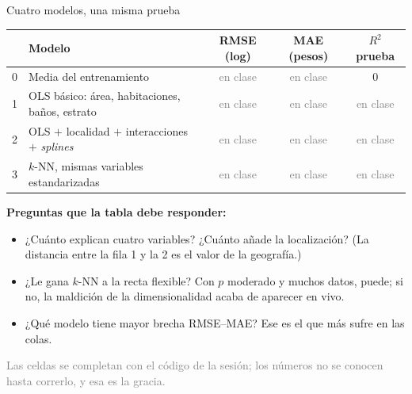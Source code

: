\documentclass{beamer}
\newcommand{\1}{\mathbb{I}}
\begin{document}
\begin{frame}{Cuatro modelos, una misma prueba}
\small
\begin{center}
\scriptsize
\setlength{\tabcolsep}{4pt}
\renewcommand{\arraystretch}{1.2}
\begin{tabular}{llccc}
\hline
 & Modelo & RMSE (log) & MAE (pesos) & $R^2$ prueba \\
\hline
0 & Media del entrenamiento & \textcolor{gray}{en clase} & \textcolor{gray}{en clase} & 0 \\
1 & OLS básico: área, habitaciones, baños, estrato & \textcolor{gray}{en clase} & \textcolor{gray}{en clase} & \textcolor{gray}{en clase} \\
2 & OLS $+$ localidad $+$ interacciones $+$ \emph{splines} & \textcolor{gray}{en clase} & \textcolor{gray}{en clase} & \textcolor{gray}{en clase} \\
3 & $k$-NN, mismas variables estandarizadas & \textcolor{gray}{en clase} & \textcolor{gray}{en clase} & \textcolor{gray}{en clase} \\
\hline
\end{tabular}
\end{center}
\pause
\vspace{0.15cm}
\textbf{Preguntas que la tabla debe responder:}
\begin{itemize}\itemsep3pt
  \item ¿Cuánto explican cuatro variables? ¿Cuánto añade la localización? (La distancia entre la fila 1 y la 2 es el valor de la geografía.)
  \item ¿Le gana $k$-NN a la recta flexible? Con $p$ moderado y muchos datos, puede; si no, la maldición de la dimensionalidad acaba de aparecer en vivo. \pause
  \item ¿Qué modelo tiene mayor brecha RMSE--MAE? Ese es el que más sufre en las colas.
\end{itemize}
\vspace{0.1cm}
\textcolor{gray}{Las celdas se completan con el código de la sesión; los números no se conocen hasta correrlo, y esa es la gracia.}
\end{frame}
\end{document}
